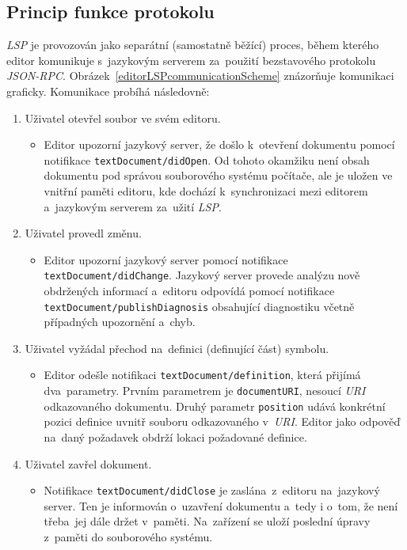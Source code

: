 \subsection{Princip funkce protokolu}
\label{lspPrincip}
\emph{LSP} je provozován jako separátní (samostatně běžící) proces, během kterého editor komunikuje s~jazykovým serverem za~použití bezstavového protokolu \emph{JSON-RPC}. Obrázek~\ref{editorLSPcommunicationScheme} znázorňuje komunikaci graficky.
Komunikace probíhá následovně:
\begin{enumerate}
    \item{Uživatel otevřel soubor ve svém editoru.
    \begin{itemize}[label={}]
        \item{Editor upozorní jazykový server, že došlo k~otevření dokumentu pomocí notifikace \texttt{textDocument/didOpen}. Od tohoto okamžiku není obsah dokumentu pod správou souborového systému počítače, ale je uložen ve vnitřní paměti editoru, kde dochází k~synchronizaci mezi editorem a~jazykovým serverem za~užití \emph{LSP}.}
    \end{itemize}
    }

    \newpage
    \item{Uživatel provedl změnu.
    \begin{itemize}[label={}]
        \item{Editor upozorní jazykový server pomocí notifikace \texttt{textDocument/didChange}. Jazykový server provede analýzu nově obdržených informací a~editoru odpovídá pomocí notifikace \texttt{textDocument/publishDiagnosis} obsahující diagnostiku včetně případných upozornění a~chyb.}
    \end{itemize}
    }
 
    \item{Uživatel vyžádal přechod na~definici (definující část) symbolu.
    \begin{itemize}[label={}]
        \item{Editor odešle notifikaci \texttt{textDocument/definition}, která přijímá dva~parametry. Prvním parametrem je \texttt{documentURI}, nesoucí \emph{URI} odkazovaného dokumentu. Druhý parametr \texttt{position} udává konkrétní pozici definice uvnitř souboru odkazovaného v~\emph{URI}. Editor jako odpověď na~daný požadavek obdrží lokaci požadované definice.}
    \end{itemize}
    }
    
    \item{Uživatel zavřel dokument.
    \begin{itemize}[label={}]
        \item{Notifikace \texttt{textDocument/didClose} je zaslána~z~editoru na~jazykový server. Ten je informován o~uzavření dokumentu a~tedy i o~tom, že není třeba~jej dále držet v~paměti. Na~zařízení se uloží poslední úpravy z~paměti do souborového systému.}
    \end{itemize}
    }
\end{enumerate}

